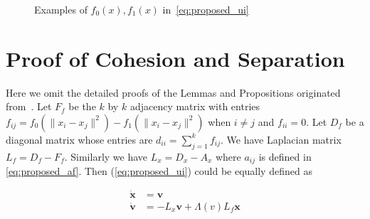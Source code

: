 \begin{figure}[htb]
  \centering
  \caption{Examples of $f_0(x), f_1(x)$ in~\ref{eq:proposed_ui}}\label{fig:f0f1}
\end{figure}

\section{Proof of Cohesion and Separation}

Here we omit the detailed proofs of the Lemmas and Propositions originated from~\cite{CuckerDong2010}. Let $F_f$ be the $k$ by $k$ adjacency matrix with entries $f_{ij}=f_0(\|x_i-x_j\|^2)-f_1(\|x_i-x_j\|^2)$ when $i\neq j$ and $f_{ii}=0$. Let $D_f$ be a diagonal matrix whose entries are $d_{ii}=\sum_{j=1}^k f_{ij}$. We have Laplacian matrix $L_f=D_f-F_f$. Similarly we have $L_x=D_x-A_x$ where $a_{ij}$ is defined in \ref{eq:proposed_af}. Then (\ref{eq:proposed_ui}) could be equally defined as

\begin{equation}\label{eq:continuous}
\begin{aligned}
\mathbf{\dot{x}}&=\mathbf{v}\\
\mathbf{\dot{v}}&=-L_x\mathbf{v}+\Lambda(v)L_f\mathbf{x}\\
\end{aligned}
\end{equation}

